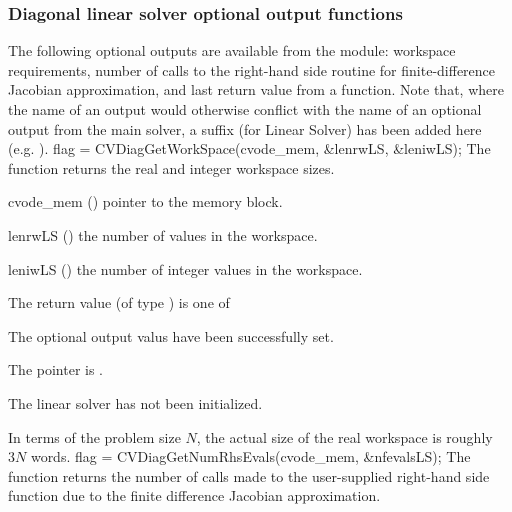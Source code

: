 \subsubsection{Diagonal linear solver optional output functions}
\label{sss:optout_diag}
The following optional outputs are available from the {\cvdiag} module:
workspace requirements, number of calls to the right-hand side routine for 
finite-difference Jacobian approximation, and last return value from a 
{\cvdiag} function.
Note that, where the name of an output would otherwise conflict with
the name of an optional output from the main solver, a suffix 
(for Linear Solver) has been added here (e.g.  ).
{
  flag = CVDiagGetWorkSpace(cvode\_mem, \&lenrwLS, \&leniwLS);
}
{
  The function  returns the
  {\cvdiag} real and integer workspace sizes.
}
{
  \begin{args}
  \item[cvode\_mem] ()
    pointer to the {\cvodes} memory block.
  \item[lenrwLS] ()
    the number of  values in the {\cvdiag} workspace.
  \item[leniwLS] ()
    the number of integer values in the {\cvdiag} workspace.
  \end{args}
}
{
  The return value  (of type ) is one of
  \begin{args}
  \item[\Id{CVDIAG\_SUCCESS}] 
    The optional output valus have been successfully set.
  \item[\Id{CVDIAG\_MEM\_NULL}]
    The  pointer is .
  \item[\Id{CVDIAG\_LMEM\_NULL}]
    The {\cvdiag} linear solver has not been initialized.
  \end{args}
}
{
  In terms of the problem size $N$, the actual size of the real workspace
  is roughly $3 N$  words.
}
{
  flag = CVDiagGetNumRhsEvals(cvode\_mem, \&nfevalsLS);
}
{
  The function  returns the
  number of calls made to the user-supplied right-hand side function due to the 
  finite difference Jacobian approximation.
}
